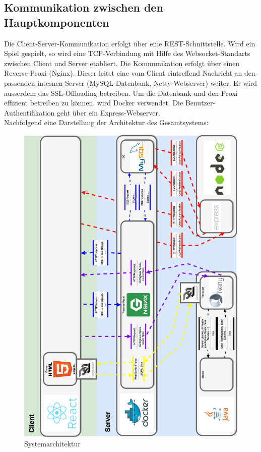 \documentclass[11pt,ngerman]{article}
\begin{document}
        \subsection{Kommunikation zwischen den Hauptkomponenten}
        Die Client-Server-Kommunikation erfolgt über eine REST-Schnittstelle. Wird ein Spiel gespielt, so wird eine TCP-Verbindung mit Hilfe des \Gls{Websocket}-Standarts zwischen Client und Server etabliert. Die Kommunikation erfolgt über einen \Gls{Reverse-Proxi} (Nginx). Dieser leitet eine vom Client eintreffend Nachricht an den passenden internen Server (MySQL-Datenbank, Netty-Webserver) weiter. Er wird ausserdem das SSL-Offloading betreiben. Um die Datenbank und den Proxi effizient betreiben zu können, wird Docker verwendet. Die Benutzer-Authentifikation geht über ein Express-\Gls{Webserver}.\\

        Nachfolgend eine Darstellung der Architektur des Gesamtsystems:
        \begin{figure}[H]
            \includegraphics[scale=0.4]{figures/architecture-draft_v3.png}
            \caption{Systemarchitektur}
        \end{figure}
        \newpage
\end{document}
